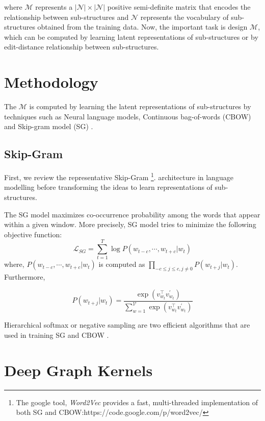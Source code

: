 where $\mathcal{M}$ represents a $|\mathcal{N}|\times |\mathcal{N}|$ positive semi-definite matrix that encodes the relationship between sub-structures and $\mathcal{N}$ represents the vocabulary of sub-structures obtained from the training data. Now, the important task is design $\mathcal{M}$, which can be computed by learning latent representations of sub-structures or by edit-distance relationship between sub-structures.

\section{Methodology} 

The $\mathcal{M}$ is computed by learning  the latent representations of
sub-structures by techniques such as Neural language models,  Continuous bag-of-words (CBOW) and Skip-gram model (SG) \citep{Yanardag2015}.

\subsection{Skip-Gram}
First, we review the representative Skip-Gram \citep{Milkov2013} \footnote{The google tool, \textit{Word2Vec} provides a fast, multi-threaded implementation of both SG and CBOW:https://code.google.com/p/word2vec/}. architecture in language modelling before transforming the ideas to learn representations of sub-structures. 

The SG model maximizes co-occurrence probability among the words that appear within a given window.  More precisely, SG model tries to minimize the following objective function: 
%
\begin{equation}
\mathcal{L}_{SG} = \sum_{t=1}^{T} \log P(w_{t-c}, \cdots , w_{t+c}|w_{t})
\label{eq:SG}
\end{equation}
%
where, $P(w_{t-c}, \cdots , w_{t+c}|w_{t})$ is computed as $\prod_{-c\leq j\leq c, j \neq 0} P(w_{t+j}|w_{t})$. Furthermore, 

%
\begin{equation}
P(w_{t+j}|w_{t}) = \frac{\exp(v^{\intercal}_{{w}_{t}} v^{\prime}_{{w}_{t}})}{\sum_{w=1}^{\mathcal{V}}\exp (v^{\intercal}_{{w}_{t}} v^{\prime}_{{w}_{t}})}
\end{equation}
%

Hierarchical softmax or negative sampling are two efficient algorithms that are used in training SG and CBOW  \citep{Yanardag2015}.

\section{Deep Graph Kernels}

